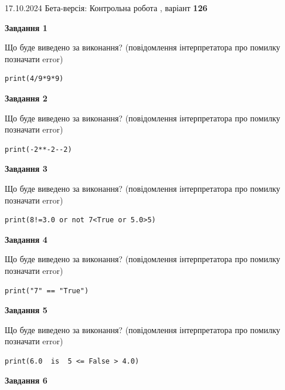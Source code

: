 \documentclass[12pt, ukrainian]{article}
\begin{document}
{\Large{17.10.2024 Бета-версія: Контрольна робота , варіант  \No \textbf { 126 }\par}}
{
\begin {large}
{\begin {center}\textbf{Завдання 1}\end {center}}

Що буде виведено за виконання? (повідомлення інтерпретатора про помилку позначати error)\par
\begin{verbatim}
print(4/9*9*9)
\end{verbatim}

{\begin {center}\textbf{Завдання 2}\end {center}}

Що буде виведено за виконання? (повідомлення інтерпретатора про помилку позначати error)\par
\begin{verbatim}
print(-2**-2--2)
\end{verbatim}

{\begin {center}\textbf{Завдання 3}\end {center}}

Що буде виведено за виконання? (повідомлення інтерпретатора про помилку позначати error)\par
\begin{verbatim}
print(8!=3.0 or not 7<True or 5.0>5)
\end{verbatim}

{\begin {center}\textbf{Завдання 4}\end {center}}

Що буде виведено за виконання? (повідомлення інтерпретатора про помилку позначати error)\par
\begin{verbatim}
print("7" == "True")
\end{verbatim}

{\begin {center}\textbf{Завдання 5}\end {center}}

Що буде виведено за виконання? (повідомлення інтерпретатора про помилку позначати error)\par
\begin{verbatim}
print(6.0  is  5 <= False > 4.0)
\end{verbatim}

{\begin {center}\textbf{Завдання 6}\end {center}}


\end{large}}
\end{document}
